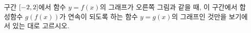 \noindent\begin{minipage}[t]{0.58\linewidth}\vspace{0pt}\raggedright 구간 $[-2{,}\mkern3mu\mathopen{}2]$에서 함수 $y=f(x)$의 그래프가 오른쪽 그림과 같을 때, 이 구간에서 합성함수 $g(f(x))$가 연속이 되도록 하는 함수 $y=g(x)$의 그래프인 것만을 보기에서 있는 대로 고르시오.\end{minipage}\hfill\begin{minipage}[t]{0.4\linewidth}\vspace{0pt}\centering \resizebox{\ifdim\width>\linewidth\linewidth\else\width\fi}{!}{}\end{minipage}\par
\noindent \bogi{\resizebox{\ifdim\width>\linewidth\linewidth\else\width\fi}{!}{}}
